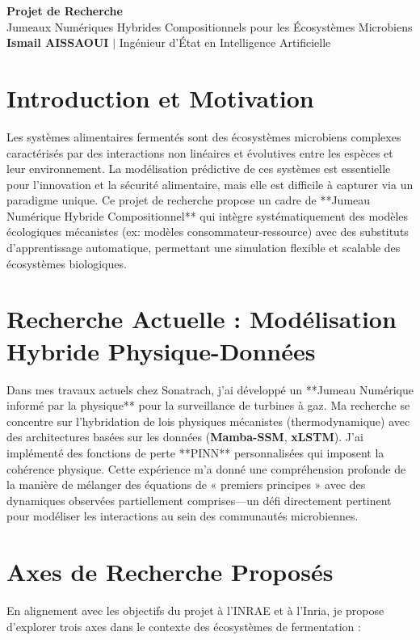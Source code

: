 \documentclass[11pt,a4paper]{article}
\begin{document}
\begin{center}
    {\LARGE\bfseries\color{titleblue} Projet de Recherche}\\[6pt]
    {\large Jumeaux Numériques Hybrides Compositionnels pour les Écosystèmes Microbiens}\\[4pt]
    \textbf{Ismail AISSAOUI} $|$ Ingénieur d'État en Intelligence Artificielle
\end{center}

\bigskip

\section{Introduction et Motivation}
Les systèmes alimentaires fermentés sont des écosystèmes microbiens complexes caractérisés par des interactions non linéaires et évolutives entre les espèces et leur environnement. La modélisation prédictive de ces systèmes est essentielle pour l'innovation et la sécurité alimentaire, mais elle est difficile à capturer via un paradigme unique. Ce projet de recherche propose un cadre de **Jumeau Numérique Hybride Compositionnel** qui intègre systématiquement des modèles écologiques mécanistes (ex: modèles consommateur-ressource) avec des substituts d'apprentissage automatique, permettant une simulation flexible et scalable des écosystèmes biologiques.

\section{Recherche Actuelle : Modélisation Hybride Physique-Données}
Dans mes travaux actuels chez Sonatrach, j'ai développé un **Jumeau Numérique informé par la physique** pour la surveillance de turbines à gaz. Ma recherche se concentre sur l'hybridation de lois physiques mécanistes (thermodynamique) avec des architectures basées sur les données (\textbf{Mamba-SSM}, \textbf{xLSTM}). J'ai implémenté des fonctions de perte **PINN** personnalisées qui imposent la cohérence physique. Cette expérience m'a donné une compréhension profonde de la manière de mélanger des équations de « premiers principes » avec des dynamiques observées partiellement comprises—un défi directement pertinent pour modéliser les interactions au sein des communautés microbiennes.

\section{Axes de Recherche Proposés}
En alignement avec les objectifs du projet à l'INRAE et à l'Inria, je propose d'explorer trois axes dans le contexte des écosystèmes de fermentation :
\end{document}
